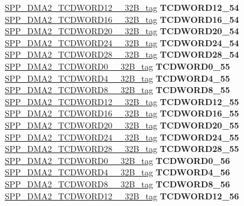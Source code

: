 \begin{DoxyCompactItemize}
\begin{tabbing}
\>\>\mbox{\hyperlink{unionSPP__DMA2__TCDWORD12____32B__tag}{SPP\_DMA2\_TCDWORD12\_\_32B\_tag}} {\bfseries TCDWORD12\_54}\\
\>\>\mbox{\hyperlink{unionSPP__DMA2__TCDWORD16____32B__tag}{SPP\_DMA2\_TCDWORD16\_\_32B\_tag}} {\bfseries TCDWORD16\_54}\\
\>\>\mbox{\hyperlink{unionSPP__DMA2__TCDWORD20____32B__tag}{SPP\_DMA2\_TCDWORD20\_\_32B\_tag}} {\bfseries TCDWORD20\_54}\\
\>\>\mbox{\hyperlink{unionSPP__DMA2__TCDWORD24____32B__tag}{SPP\_DMA2\_TCDWORD24\_\_32B\_tag}} {\bfseries TCDWORD24\_54}\\
\>\>\mbox{\hyperlink{unionSPP__DMA2__TCDWORD28____32B__tag}{SPP\_DMA2\_TCDWORD28\_\_32B\_tag}} {\bfseries TCDWORD28\_54}\\
\>\>\mbox{\hyperlink{unionSPP__DMA2__TCDWORD0____32B__tag}{SPP\_DMA2\_TCDWORD0\_\_32B\_tag}} {\bfseries TCDWORD0\_55}\\
\>\>\mbox{\hyperlink{unionSPP__DMA2__TCDWORD4____32B__tag}{SPP\_DMA2\_TCDWORD4\_\_32B\_tag}} {\bfseries TCDWORD4\_55}\\
\>\>\mbox{\hyperlink{unionSPP__DMA2__TCDWORD8____32B__tag}{SPP\_DMA2\_TCDWORD8\_\_32B\_tag}} {\bfseries TCDWORD8\_55}\\
\>\>\mbox{\hyperlink{unionSPP__DMA2__TCDWORD12____32B__tag}{SPP\_DMA2\_TCDWORD12\_\_32B\_tag}} {\bfseries TCDWORD12\_55}\\
\>\>\mbox{\hyperlink{unionSPP__DMA2__TCDWORD16____32B__tag}{SPP\_DMA2\_TCDWORD16\_\_32B\_tag}} {\bfseries TCDWORD16\_55}\\
\>\>\mbox{\hyperlink{unionSPP__DMA2__TCDWORD20____32B__tag}{SPP\_DMA2\_TCDWORD20\_\_32B\_tag}} {\bfseries TCDWORD20\_55}\\
\>\>\mbox{\hyperlink{unionSPP__DMA2__TCDWORD24____32B__tag}{SPP\_DMA2\_TCDWORD24\_\_32B\_tag}} {\bfseries TCDWORD24\_55}\\
\>\>\mbox{\hyperlink{unionSPP__DMA2__TCDWORD28____32B__tag}{SPP\_DMA2\_TCDWORD28\_\_32B\_tag}} {\bfseries TCDWORD28\_55}\\
\>\>\mbox{\hyperlink{unionSPP__DMA2__TCDWORD0____32B__tag}{SPP\_DMA2\_TCDWORD0\_\_32B\_tag}} {\bfseries TCDWORD0\_56}\\
\>\>\mbox{\hyperlink{unionSPP__DMA2__TCDWORD4____32B__tag}{SPP\_DMA2\_TCDWORD4\_\_32B\_tag}} {\bfseries TCDWORD4\_56}\\
\>\>\mbox{\hyperlink{unionSPP__DMA2__TCDWORD8____32B__tag}{SPP\_DMA2\_TCDWORD8\_\_32B\_tag}} {\bfseries TCDWORD8\_56}\\
\>\>\mbox{\hyperlink{unionSPP__DMA2__TCDWORD12____32B__tag}{SPP\_DMA2\_TCDWORD12\_\_32B\_tag}} {\bfseries TCDWORD12\_56}\\

\end{tabbing}
\end{DoxyCompactItemize}
